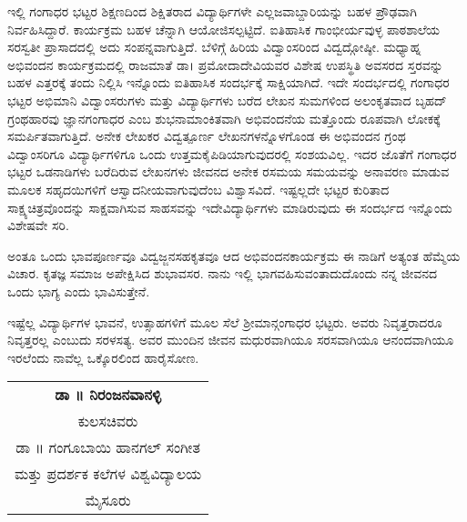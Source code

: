 {ಇಲ್ಲಿ ಗಂಗಾಧರ ಭಟ್ಟರ ಶಿಕ್ಷಣದಿಂದ ಶಿಕ್ಷಿತರಾದ ವಿದ್ಯಾರ್ಥಿಗಳೇ ಎಲ್ಲ\break ಜವಾಬ್ದಾರಿಯನ್ನು ಬಹಳ ಪ್ರೌಢವಾಗಿ ನಿರ್ವಹಿಸಿದ್ದಾರೆ. ಕಾರ್ಯಕ್ರಮ ಬಹಳ ಚೆನ್ನಾಗಿ ಆಯೋಜಿಸಲ್ಪಟ್ಟಿದೆ. ಐತಿಹಾಸಿಕ ಗಾಂಭೀರ್ಯವುಳ್ಳ ಪಾಠಶಾಲೆಯ ಸರಸ್ವತೀ ಪ್ರಾಸಾದದಲ್ಲಿ ಅದು ಸಂಪನ್ನವಾಗುತ್ತಿದೆ. ಬೆಳಿಗ್ಗೆ ಹಿರಿಯ ವಿದ್ವಾಂಸರಿಂದ ವಿದ್ವದ್ಗೋಷ್ಠೀ.  ಮಧ್ಯಾಹ್ನ ಅಭಿವಂದನ ಕಾರ್ಯಕ್ರಮದಲ್ಲಿ ರಾಜಮಾತೆ ಡಾ। ಪ್ರಮೋದಾ\break ದೇವಿಯವರ ವಿಶೇಷ ಉಪಸ್ಥಿತಿ ಅವಸರದ ಸ್ತರವನ್ನು ಬಹಳ ಎತ್ತರಕ್ಕೆ ತಂದು ನಿಲ್ಲಿಸಿ ಇನ್ನೊಂದು ಐತಿಹಾಸಿಕ ಸಂದರ್ಭಕ್ಕೆ ಸಾಕ್ಷಿಯಾಗಿದೆ. ಇದೇ ಸಂದರ್ಭದಲ್ಲಿ ಗಂಗಾಧರ ಭಟ್ಟರ ಅಭಿಮಾನಿ ವಿದ್ವಾಂಸರುಗಳು ಮತ್ತು ವಿದ್ಯಾರ್ಥಿಗಳು ಬರೆದ ಲೇಖನ ಸುಮಗಳಿಂದ ಅಲಂಕೃತವಾದ ಬೃಹದ್ ಗ್ರಂಥಹಾರವು ಜ್ಞಾನಗಂಗಾಧರ ಎಂಬ ಶುಭನಾಮಾಂಕಿತವಾಗಿ ಅಭಿವಂದನೆಯ ಮತ್ತೊಂದು ರೂಪವಾಗಿ ಲೋಕಕ್ಕೆ ಸಮರ್ಪಿತವಾಗುತ್ತಿದೆ. ಅನೇಕ ಲೇಖಕರ ವಿದ್ವತ್ಪೂರ್ಣ ಲೇಖನಗಳನ್ನೊಳಗೊಂಡ ಈ ಅಭಿವಂದನ ಗ್ರಂಥ ವಿದ್ವಾಂಸರಿಗೂ ವಿದ್ಯಾರ್ಥಿಗಳಿಗೂ ಒಂದು ಉತ್ತಮ\break ಕೈಪಿಡಿಯಾಗುವುದರಲ್ಲಿ ಸಂಶಯವಿಲ್ಲ. ಇದರ ಜೊತೆಗೆ ಗಂಗಾಧರ ಭಟ್ಟರ ಒಡನಾಡಿಗಳು ಬರೆದಿರುವ ಲೇಖನಗಳು ಜೀವನದ ಅನೇಕ ರಸಮಯ \enginline{-} ಸಮಯವನ್ನು ಅನಾವರಣ ಮಾಡುವ ಮೂಲಕ ಸಹೃದಯಿಗಳಿಗೆ ಆಸ್ವಾದನೀಯ\-ವಾಗುವುದೆಂಬ ವಿಶ್ವಾಸವಿದೆ. ಇಷ್ಟಲ್ಲದೇ ಭಟ್ಟರ ಕುರಿತಾದ ಸಾಕ್ಷ್ಯಚಿತ್ರವೊಂದನ್ನು ಸಾಕ್ಷವಾಗಿಸುವ ಸಾಹಸವನ್ನು ಇದೇ\break ವಿದ್ಯಾರ್ಥಿಗಳು ಮಾಡಿರುವುದು ಈ ಸಂದರ್ಭದ ಇನ್ನೊಂದು ವಿಶೇಷವೇ ಸರಿ. 

ಅಂತೂ ಒಂದು ಭಾವಪೂರ್ಣವೂ ವಿದ್ವಜ್ಜನಸಹಕೃತವೂ ಆದ ಅಭಿವಂದನ\break ಕಾರ್ಯಕ್ರಮ  ಈ ನಾಡಿಗೆ ಅತ್ಯಂತ ಹೆಮ್ಮೆಯ ವಿಚಾರ. ಕೃತಜ್ಞ ಸಮಾಜ ಅಪೇಕ್ಷಿಸಿದ ಶುಭಾವಸರ. ನಾನು ಇಲ್ಲಿ ಭಾಗವಹಿಸುವಂತಾದುದೊಂದು ನನ್ನ ಜೀವನದ ಒಂದು ಭಾಗ್ಯ ಎಂದು ಭಾವಿಸುತ್ತೇನೆ.

ಇಷ್ಟೆಲ್ಲ ವಿದ್ಯಾರ್ಥಿಗಳ ಭಾವನೆ, ಉತ್ಸಾಹಗಳಿಗೆ ಮೂಲ ಸೆಲೆ ಶ್ರೀಮಾನ್\break ಗಂಗಾಧರ ಭಟ್ಟರು. ಅವರು ನಿವೃತ್ತರಾದರೂ ನಿವೃತ್ತರಲ್ಲ ಎಂಬುದು ಸರಳಸತ್ಯ. ಅವರ ಮುಂದಿನ ಜೀವನ ಮಧುರವಾಗಿಯೂ ಸರಸವಾಗಿಯೂ ಆನಂದವಾಗಿಯೂ  ಇರಲೆಂದು ನಾವೆಲ್ಲ ಒಕ್ಕೊರಲಿಂದ ಹಾರೈಸೋಣ.
\bigskip
\bigskip

\hfill\begin{tabular}{c}
\textbf{ಡಾ ॥ ನಿರಂಜನವಾನಳ್ಳಿ}\\
ಕುಲಸಚಿವರು\\
ಡಾ ॥ ಗಂಗೂಬಾಯಿ ಹಾನಗಲ್ ಸಂಗೀತ \\
ಮತ್ತು ಪ್ರದರ್ಶಕ ಕಲೆಗಳ ವಿಶ್ವವಿದ್ಯಾಲಯ\\
ಮೈಸೂರು
\end{tabular}
\vskip 1cm
\articleend
\vfill
}

